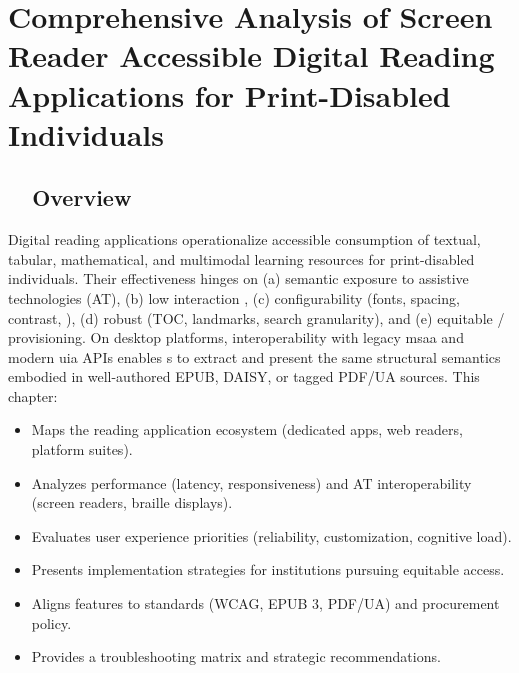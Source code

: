 \chapter{Comprehensive Analysis of Screen Reader Accessible Digital Reading Applications for Print-Disabled Individuals}
\label{chap:reading-apps}

\section{~~Overview}
\label{sec:sr27-overview}
Digital reading applications operationalize accessible consumption of textual, tabular, mathematical, and multimodal learning resources for print-disabled individuals. Their effectiveness hinges on (a) semantic exposure to assistive technologies (AT), (b) low interaction , (c) configurability (fonts, spacing, contrast, ), (d) robust  (TOC, landmarks, search granularity), and (e) equitable / provisioning. On desktop platforms, interoperability with legacy \gls{msaa} and modern \gls{uia}  APIs enables s to extract and present the same structural semantics embodied in well-authored EPUB, DAISY, or tagged PDF/UA sources. This chapter:
\begin{itemize}
	\item Maps the reading application ecosystem (dedicated apps, web readers, platform suites).
	\item Analyzes performance (latency, responsiveness) and AT interoperability (screen readers, braille displays).
	\item Evaluates user experience priorities (reliability, customization, cognitive load).
	\item Presents implementation strategies for institutions pursuing equitable access.
	\item Aligns features to standards (WCAG, EPUB 3, PDF/UA) and procurement policy.
	\item Provides a troubleshooting matrix and strategic recommendations.
\end{itemize}

